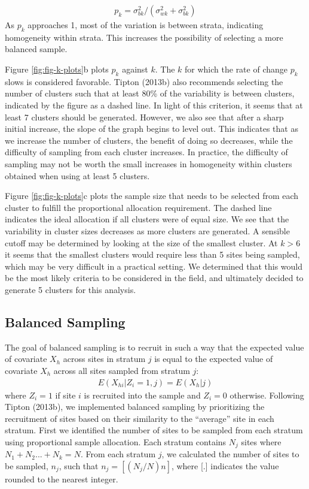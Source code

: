 \documentclass[man,floatsintext]{apa6}
\begin{document}
\begin{align} \label{eq:pk}
p_k = \sigma_{bk}^2/(\sigma_{wk}^2 + \sigma_{bk}^2)
\end{align}
As \(p_k\) approaches 1, most of the variation is between strata, indicating homogeneity within strata. This increases the possibility of selecting a more balanced sample.

Figure \ref{fig:fig-k-plots}b plots \(p_k\) against \(k\). The \(k\) for which the rate of change \(p_k\) slows is considered favorable. Tipton (2013b) also recommends selecting the number of clusters such that at least 80\% of the variability is between clusters, indicated by the figure as a dashed line. In light of this criterion, it seems that at least 7 clusters should be generated. However, we also see that after a sharp initial increase, the slope of the graph begins to level out. This indicates that as we increase the number of clusters, the benefit of doing so decreases, while the difficulty of sampling from each cluster increases. In practice, the difficulty of sampling may not be worth the small increases in homogeneity within clusters obtained when using at least 5 clusters.

Figure \ref{fig:fig-k-plots}c plots the sample size that needs to be selected from each cluster to fulfill the proportional allocation requirement. The dashed line indicates the ideal allocation if all clusters were of equal size. We see that the variability in cluster sizes decreases as more clusters are generated. A sensible cutoff may be determined by looking at the size of the smallest cluster. At \(k > 6\) it seems that the smallest clusters would require less than 5 sites being sampled, which may be very difficult in a practical setting. We determined that this would be the most likely criteria to be considered in the field, and ultimately decided to generate 5 clusters for this analysis.

\hypertarget{balanced-sampling}{%
\subsection{Balanced Sampling}\label{balanced-sampling}}

The goal of balanced sampling is to recruit in such a way that the expected value of covariate \(X_h\) across sites in stratum \(j\) is equal to the expected value of covariate \(X_h\) across all sites sampled from stratum \(j\):
\begin{align}
E(X_{hi}|Z_i = 1, j) = E(X_h|j)
\end{align}
where \(Z_i = 1\) if site \(i\) is recruited into the sample and \(Z_i = 0\) otherwise. Following Tipton (2013b), we implemented balanced sampling by prioritizing the recruitment of sites based on their similarity to the \enquote{average} site in each stratum. First we identified the number of sites to be sampled from each stratum using proportional sample allocation. Each stratum contains \(N_j\) sites where \(N_1 + N_2 ... + N_k = N\). From each stratum \(j\), we calculated the number of sites to be sampled, \(n_j\), such that \(n_j = [(N_j/N)n]\), where {[}.{]} indicates the value rounded to the nearest integer.
\end{document}

